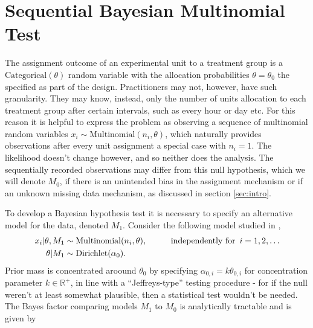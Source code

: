 \documentclass[11pt]{article}
\begin{document}
\section{Sequential Bayesian Multinomial Test}
\label{sec:srm_testing}
The assignment outcome of an experimental unit to a treatment group is a $\text{Categorical}(\theta)$ random variable with the allocation probabilities $\theta=\theta_0$ the specified as part of the design. Practitioners may not, however, have such granularity. They may know, instead, only the number of units allocation to each treatment group after certain intervals, such as every hour or day etc. For this reason it is helpful to express the problem as observing a sequence of multinomial random variables $x_i \sim \text{Multinomial}(n_i, \theta)$, which naturally provides observations after every unit assignment a special case with $n_i = 1$. The likelihood doesn't change however, and so neither does the analysis.
The sequentially recorded observations may differ from this null hypothesis, which we will denote $M_0$, if there is an unintended bias in the assignment mechanism or if an unknown missing data mechanism, as discussed in section \ref{sec:intro}.

To develop a Bayesian hypothesis test it is necessary to specify an alternative model for the data, denoted $M_1$. Consider the following model studied in \cite{good},
\begin{align}
    x_i | \theta, M_1 &\sim \text{Multinomial}(n_i,\theta), \hspace{1cm} \text{independently for }\, i=1,2,\dots\\
  \theta | M_1 &\sim \text{Dirichlet}(\alpha_0).\notag
\end{align}
Prior mass is concentrated aroound $\theta_0$ by specifying $\alpha_{0,i} = k \theta_{0,i}$ for concentration parameter $k \in \mathbb{R}^+$, in line with a ``Jeffreys-type'' testing procedure - for if the null weren't at least somewhat plausible, then a statistical test wouldn't be needed. The Bayes factor comparing models $M_1$ to $M_0$ is analytically tractable and is given by
\end{document}
